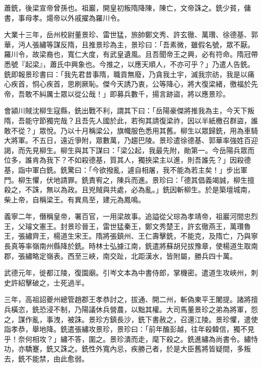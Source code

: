 
\begin{pinyinscope}

 蕭銑，後梁宣帝曾孫也。祖巖，開皇初叛隋降陳，陳亡，文帝誅之。銑少貧，傭書，事母孝。煬帝以外戚擢為羅川令。



 大業十三年，岳州校尉董景珍、雷世猛，旅帥鄭文秀、許玄徹、萬瓚、徐德基、郭華，沔人張繡等謀反隋，且推景珍為主，景珍曰：「吾素微，雖假名號，眾不厭。羅川令，故梁裔也，寬仁大度，有武皇遺風。且吾聞帝王之興，必有符命。隋冠帶悉號『起梁』，蕭氏中興象也。今推之，以應天順人，不亦可乎？」乃遣人告銑。銑即報景珍書曰：「我先君昔事隋，職貢無廢，乃貪我土宇，滅我宗祊，我是以痛心疾首，恫心疾首，思刷厥恥。傑今天誘乃衷，公等降心，將大復梁緒，徼福於先帝，吾敢不糾厲士眾以從公哉！」即募兵數千，揚言跡盜，將以應景珍。



 會潁川賊沈柳生寇縣，銑出戰不利，謂其下曰：「岳陽豪傑將推我為主，今天下叛隋，吾能守節獨完哉？且吾先人國於此，若徇其請復梁祚，因以半紙檄召群盜，誰敢不從？」眾悅。乃以十月稱梁公，旗幟服色悉用其舊。柳生以眾歸銑，用為車騎大將軍。不五日，遠近爭附，眾數萬，乃趨巴陵。景珍遣徐德基、郭華率強姓百迎謁，而先見柳生。柳生與其下謀曰：「梁公起，我最先附，勛第一。今岳陽兵眾而位多，誰肯為我下？不如殺德基，質其人，獨挾梁主以進，則吾誰先？」因殺德基，詣中軍白銑。銑驚曰：「今欲撥亂，遽自相屠，我不能為若主矣！」步出軍門。柳生懼，伏地請罪。銑責宥之，陳兵而進。景珍曰：「德其倡義竭誠，柳生擅殺之，不誅，無以為政。且兇賊與共處，必為亂。」銑因斬柳生。於是築壇城南，柴上帝，自稱梁王。有異鳥至，建元為鳳鳴。



 義寧二年，僭稱皇帝，署百官，一用梁故事。追謚從父琮為孝靖帝，祖巖河間忠烈王，父璿文憲王。封景珍晉王，雷世猛秦王，鄭文秀楚王，許玄徹燕王，萬瓚魯王，張繡齊王，楊道生宋王。隋將張鎮州、王仁壽擊銑，不能克，及隋亡，乃與寧長真等率嶺南州縣降於銑。時林士弘據江南，銑遣將蘇胡兒拔豫章，使楊道生取南郡，張繡略定嶺表。西至三峽，南交趾，北距漢水，皆附屬，勝兵四十萬。



 武德元年，徙都江陵，復園廟。引岑文本為中書侍郎，掌機密。遣道生攻峽州，刺史許紹擊破之，士死過半。



 三年，高祖詔夔州總管趙郡王孝恭討之，拔通、開二州，斬偽東平王闍提。諸將擅兵橫恣，銑恐浸不制，乃陽議休兵營農，以黜其權。大司馬董景珍之弟為將軍，怨之，謀作亂，事洩，被誅。景珍方鎮長沙，銑下書赦之，召還江陵。景珍懼，遣使詣孝恭，舉地降。銑遣張繡攻景珍，景珍曰：「前年醢彭越，往年殺韓信，獨不見乎！奈何相攻？」繡不答，圍之。景珍潰而走，麾下殺之。銑進繡為尚書令。繡恃功，亦驕蹇，銑又誅之。銑性外寬內忌，疾勝己者，於是大臣舊將皆疑間，多叛去，銑不能禁，由此愈弱。




\end{pinyinscope}
